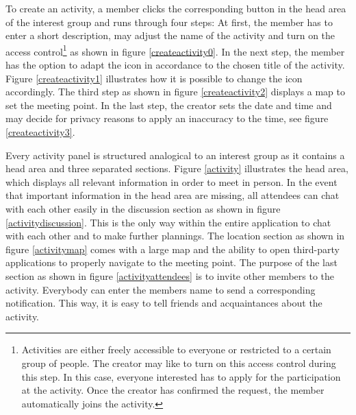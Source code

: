 \documentclass[12pt,numbers=noenddot,parskip,bibliography=totocnumbered,listof=totocnumbered,draft]{scrreprt}
\begin{document}
To create an activity, a member clicks the corresponding button in the head area of the interest group and runs through four steps: At first, the member has to enter a short description, may adjust the name of the activity and turn on the access control\footnote{Activities are either freely accessible to everyone or restricted to a certain group of people. The creator may like to turn on this access control during this step. In this case, everyone interested has to apply for the participation at the activity. Once the creator has confirmed the request, the member automatically joins the activity.} as shown in figure \ref{createactivity0}. In the next step, the member has the option to adapt the icon in accordance to the chosen title of the activity. Figure \ref{createactivity1} illustrates how it is possible to change the icon accordingly. The third step as shown in figure \ref{createactivity2} displays a map to set the meeting point. In the last step, the creator sets the date and time and may decide for privacy reasons to apply an inaccuracy to the time, see figure \ref{createactivity3}.

Every activity panel is structured analogical to an interest group as it contains a head area and three separated sections. Figure \ref{activity} illustrates the head area, which displays all relevant information in order to meet in person. In the event that important information in the head area are missing, all attendees can chat with each other easily in the discussion section as shown in figure \ref{activitydiscussion}. This is the only way within the entire application to chat with each other and to make further plannings. The location section as shown in figure \ref{activitymap} comes with a large map and the ability to open third-party applications to properly navigate to the meeting point. The purpose of the last section as shown in figure \ref{activityattendees} is to invite other members to the activity. Everybody can enter the members name to send a corresponding notification. This way, it is easy to tell friends and acquaintances about the activity.
\end{document}
